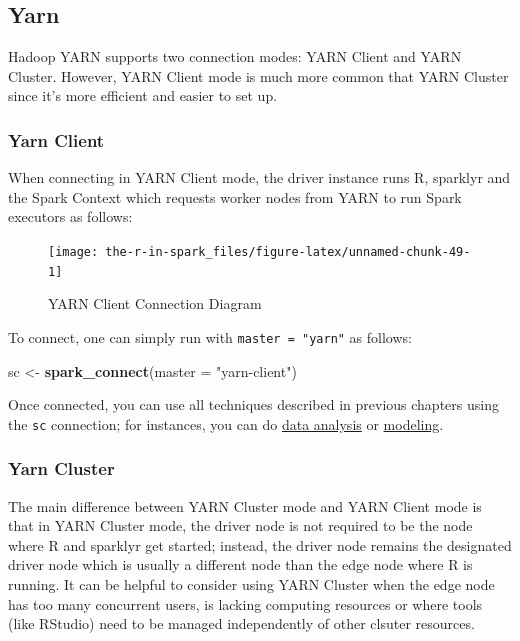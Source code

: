 \documentclass[]{book}
\newenvironment{Shaded}{\begin{snugshade}}{\end{snugshade}}
\newcommand{\DataTypeTok}[1]{\textcolor[rgb]{0.13,0.29,0.53}{#1}}
\newcommand{\KeywordTok}[1]{\textcolor[rgb]{0.13,0.29,0.53}{\textbf{#1}}}
\newcommand{\NormalTok}[1]{#1}
\newcommand{\StringTok}[1]{\textcolor[rgb]{0.31,0.60,0.02}{#1}}
\theoremstyle{definition}
\theoremstyle{definition}
\theoremstyle{definition}
\theoremstyle{remark}
\begin{document}
\hypertarget{yarn-1}{%
\subsection{Yarn}\label{yarn-1}}

Hadoop YARN supports two connection modes: YARN Client and YARN Cluster.
However, YARN Client mode is much more common that YARN Cluster since
it's more efficient and easier to set up.

\hypertarget{yarn-client}{%
\subsubsection{Yarn Client}\label{yarn-client}}

When connecting in YARN Client mode, the driver instance runs R,
sparklyr and the Spark Context which requests worker nodes from YARN to
run Spark executors as follows:

\begin{figure}

{\centering \texttt{[image: the-r-in-spark\_files/figure-latex/unnamed-chunk-49-1]} 

}

\caption{YARN Client Connection Diagram}\label{fig:unnamed-chunk-49}
\end{figure}

To connect, one can simply run with \texttt{master\ =\ "yarn"} as
follows:

\begin{Shaded}
\begin{Highlighting}[]
\NormalTok{sc <-}\StringTok{ }\KeywordTok{spark_connect}\NormalTok{(}\DataTypeTok{master =} \StringTok{"yarn-client"}\NormalTok{)}
\end{Highlighting}
\end{Shaded}

Once connected, you can use all techniques described in previous
chapters using the \texttt{sc} connection; for instances, you can do
\href{analysis}{data analysis} or
\protect\hyperlink{modeling}{modeling}.

\hypertarget{yarn-cluster}{%
\subsubsection{Yarn Cluster}\label{yarn-cluster}}

The main difference between YARN Cluster mode and YARN Client mode is
that in YARN Cluster mode, the driver node is not required to be the
node where R and sparklyr get started; instead, the driver node remains
the designated driver node which is usually a different node than the
edge node where R is running. It can be helpful to consider using YARN
Cluster when the edge node has too many concurrent users, is lacking
computing resources or where tools (like RStudio) need to be managed
independently of other clsuter resources.
\end{document}
